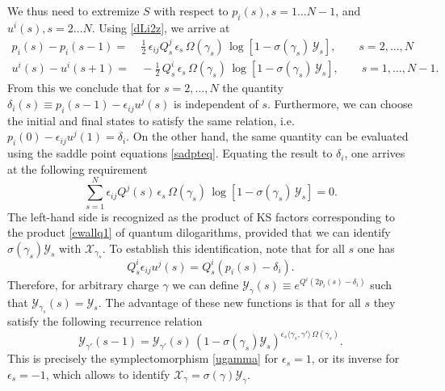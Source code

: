 \documentclass[12pt,reqno]{article}
\numberwithin{equation}{section}
\newcommand{\be}{\begin{equation}}
\newcommand{\ee}{\end{equation}}
\def\eps{\varepsilon}
\newcommand{\cX}{\mathcal{X}}
\newcommand{\cY}{\mathcal{Y}}
\def\eps{\epsilon}
\numberwithin{equation}{section}
\begin{document}
We thus need to extremize $S$ with respect to $p_i(s), s=1\dots N-1$, and
$u^i(s), s=2\dots N$. Using \eqref{dLi2z}, we arrive at
\be
\label{sadpteq}
\begin{split}
p_i(s)-p_i(s-1) =&\, \frac12\, \epsilon_{ij} Q^j_s \, \eps_s \,\Omega(\gamma_{s} )\,
\log\left[1-\sigma(\gamma_{s} ) \,\cY_s \right],
\qquad
s=2,\dots, N
 \\
u^i(s)-u^i(s+1) =&\, -\frac12\, Q^i_s \, \eps_s \,  \Omega(\gamma_{s} )\,
\log\left[1-\sigma(\gamma_{s}) \,\cY_s \right],
\qquad
s=1,\dots, N-1 .
\end{split}
\ee
From this we conclude that for $s=2,...,N$ the quantity $\delta_i(s)\equiv p_i(s-1)-\epsilon_{ij} u^j(s)$ is independent of $s$.
 Furthermore, we can choose the initial and final states to satisfy the same relation, i.e.
$p_i(0)-\epsilon_{ij} u^j(1)=\delta_i$.
On the other hand, the same quantity can be evaluated using the saddle point equations \eqref{sadpteq}.
Equating the result to $\delta_i$, one arrives at the following requirement
\be
\sum_{s=1}^N\epsilon_{ij} Q^j(s) \, \eps_s \,\Omega(\gamma_{s} )\,
\log\left[1-\sigma(\gamma_{s} ) \,\cY_s \right]=0.
\label{delsum}
\ee
The left-hand side is recognized as the product of
KS factors corresponding to the product \eqref{ewallq1}
of quantum dilogarithms, provided that we can
identify $\sigma(\gamma_s)\cY_s$ with $\cX_{\gamma_s}$.
To establish this identification, note
that for all $s$ one has
\be
Q^i_s \epsilon_{ij} u^j(s) = Q^i_s (p_i(s)-\delta_i) .
\ee
Therefore, for arbitrary charge $\gamma$ we can define $\cY_{\gamma}(s)\equiv e^{Q^i(2p_i(s)-\delta_i) }$
such that $\cY_{\gamma_s}(s)=\cY_s$. The advantage of these new functions is that for all $s$
they satisfy the following recurrence relation
\be
\cY_{\gamma'}(s-1) = \cY_{\gamma'}(s)\, \left( 1-\sigma(\gamma_{s} ) \cY_s\right)^{\eps_s \langle
\gamma_{s} , \gamma'\rangle \, \Omega(\gamma_{s} )}.
\ee
This is precisely the symplectomorphism \eqref{ugamma} for $\eps_s=1$, or
its inverse for $\eps_s=-1$, which allows to identify $\cX_\gamma=\sigma(\gamma)\cY_\gamma$.
\end{document}
